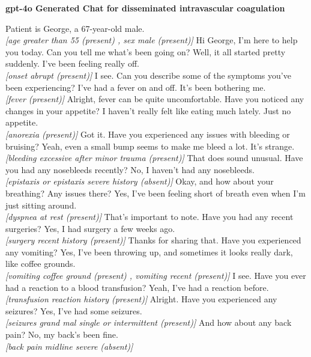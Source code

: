 \begin{figure*}[p]
\begin{tcolorbox}[boxsep=2pt,left=2pt,right=2pt,top=2pt,bottom=2pt,colback=White,]
\textbf{gpt-4o Generated Chat for disseminated intravascular coagulation}
\vspace{-2em}
\begin{chat}
 Patient is George, a 67-year-old male. \\
\textit{[age greater than 55 (present) , sex male (present)]}
 Hi George, I'm here to help you today. Can you tell me what's been going on?
 Well, it all started pretty suddenly. I've been feeling really off. \\
\textit{[onset abrupt (present)]}
 I see. Can you describe some of the symptoms you've been experiencing?
 I've had a fever on and off. It's been bothering me. \\
\textit{[fever (present)]}
 Alright, fever can be quite uncomfortable. Have you noticed any changes in your appetite?
 I haven't really felt like eating much lately. Just no appetite. \\
\textit{[anorexia (present)]}
 Got it. Have you experienced any issues with bleeding or bruising?
 Yeah, even a small bump seems to make me bleed a lot. It's strange. \\
\textit{[bleeding excessive after minor trauma (present)]}
 That does sound unusual. Have you had any nosebleeds recently?
 No, I haven't had any nosebleeds. \\
\textit{[epistaxis or epistaxis severe history (absent)]}
 Okay, and how about your breathing? Any issues there?
 Yes, I've been feeling short of breath even when I'm just sitting around. \\
\textit{[dyspnea at rest (present)]}
 That's important to note. Have you had any recent surgeries?
 Yes, I had surgery a few weeks ago. \\
\textit{[surgery recent history (present)]}
 Thanks for sharing that. Have you experienced any vomiting?
 Yes, I've been throwing up, and sometimes it looks really dark, like coffee grounds. \\
\textit{[vomiting coffee ground (present) , vomiting recent (present)]}
 I see. Have you ever had a reaction to a blood transfusion?
 Yeah, I've had a reaction before. \\
\textit{[transfusion reaction history (present)]}
 Alright. Have you experienced any seizures?
 Yes, I've had some seizures. \\
\textit{[seizures grand mal single or intermittent (present)]}
 And how about any back pain?
 No, my back's been fine. \\
\textit{[back pain midline severe (absent)]}
\end{chat}
\vspace{-2em}
\end{tcolorbox}



\end{figure*}
